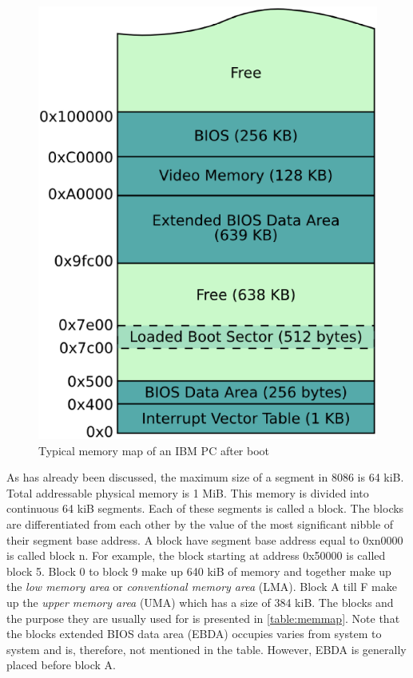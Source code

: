 \begin{figure}[h]
  \centering
  \includegraphics[scale=0.30]{figures/memmap.eps}
  \caption{Typical memory map of an IBM PC after boot \cite{blundell2009writing}}
\label{fig:memmap}
\end{figure}

As has already been discussed, the maximum size of a segment in 8086 is 64 kiB. Total addressable physical memory is 1 MiB. This memory is divided into continuous 64 kiB segments. Each of these segments is called a block. The blocks are differentiated from each other by the value of the most significant nibble of their segment base address. A block have segment base address equal to 0xn0000 is called block n. For example, the block starting at address 0x50000 is called block 5. Block 0 to block 9 make up 640 kiB of memory and together make up the \textit{low memory area} or \textit{conventional memory area} (LMA). Block A till F make up the \textit{upper memory area} (UMA) which has a size of 384 kiB. The blocks and the purpose they are usually used for is presented in \autoref{table:memmap}. Note that the blocks extended BIOS data area (EBDA) occupies varies from system to system and is, therefore, not mentioned in the table. However, EBDA is generally placed before block A.


